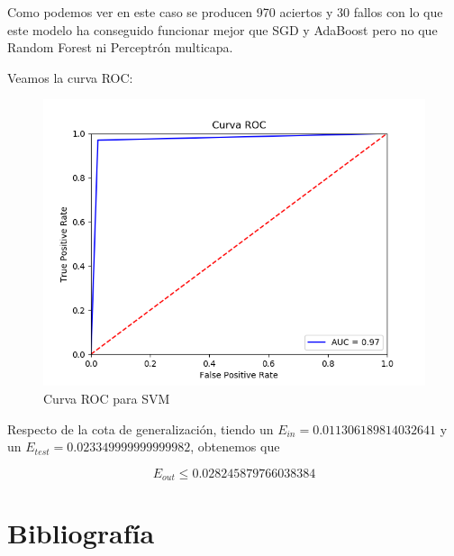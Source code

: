 Como podemos ver en este caso se producen 970 aciertos y 30 fallos con lo que este modelo ha conseguido funcionar mejor que SGD y AdaBoost pero no que Random Forest ni Perceptrón multicapa.

Veamos la curva ROC:

\begin{figure}[H] %
	\centering
	\includegraphics[scale=0.6]{SVM-ROC.png}  %
	\caption{Curva ROC para SVM} 
	\label{fig:roc-svm}
\end{figure}

Respecto de la cota de generalización, tiendo un $E_{in}= 0.011306189814032641$ y un $E_{test} = 0.023349999999999982$, obtenemos que

$$E_{out} \leq 0.028245879766038384$$

\newpage
\section{Bibliografía}





